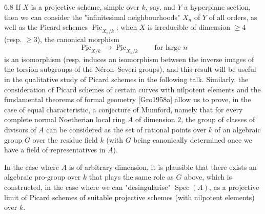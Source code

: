 \begin{remark}{6.8}
    If \(X\) is a projective scheme, simple over \(k\), say, and \(Y\) a hyperplane section, then we can consider the "infinitesimal neighbourhoods" \(X_n\) of \(Y\) of all orders, as well as the Picard schemes \(\underline {\operatorname {Pic}}_{X_n/k}\);
    when \(X\) is irreducible of dimension \(\geqslant 4\) (resp. \(\geqslant 3\)), the canonical morphism
    \[       \underline {\operatorname {Pic}}_{X/k}       \to \underline {\operatorname {Pic}}_{X_n/k}       \qquad \text {for large }n     \]
    is an isomorphism (resp. induces an isomorphism between the inverse images of the torsion subgroups of the Néron–Severi groups), and this result will be useful in the qualitative study of Picard schemes in the following talk.
    Similarly, the consideration of Picard schemes of certain curves with nilpotent elements and the fundamental theorems of formal geometry [Gro1958a] allow us to prove, in the case of equal characteristic, a conjecture of Mumford, namely that for every complete normal Noetherian local ring \(A\) of dimension \(2\), the group of classes of divisors of \(A\) can be considered as the set of rational points over \(k\) of an algebraic group \(G\) over the residue field \(k\) (with \(G\) being canonically determined once we have a field of representatives in \(A\)).
    
    In the case where \(A\) is of arbitrary dimension, it is plausible that there exists an algebraic pro-group over \(k\) that plays the same role as \(G\) above, which is constructed, in the case where we can "desingularise" \(\operatorname {Spec}(A)\), as a projective limit of Picard schemes of suitable projective schemes (with nilpotent elements) over \(k\).\end{remark}